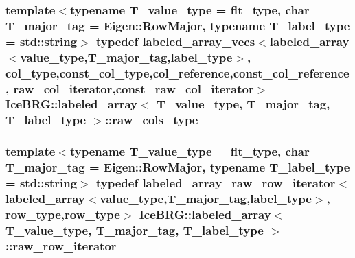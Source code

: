 \subsubsection[{raw\+\_\+cols\+\_\+type}]{\setlength{\rightskip}{0pt plus 5cm}template$<$typename T\+\_\+value\+\_\+type = flt\+\_\+type, char T\+\_\+major\+\_\+tag = Eigen\+::\+Row\+Major, typename T\+\_\+label\+\_\+type = std\+::string$>$ typedef {\bf labeled\+\_\+array\+\_\+vecs}$<${\bf labeled\+\_\+array}$<${\bf value\+\_\+type},T\+\_\+major\+\_\+tag,{\bf label\+\_\+type}$>$, {\bf col\+\_\+type},{\bf const\+\_\+col\+\_\+type},{\bf col\+\_\+reference},{\bf const\+\_\+col\+\_\+reference}, {\bf raw\+\_\+col\+\_\+iterator},{\bf const\+\_\+raw\+\_\+col\+\_\+iterator}$>$ {\bf Ice\+B\+R\+G\+::labeled\+\_\+array}$<$ T\+\_\+value\+\_\+type, T\+\_\+major\+\_\+tag, T\+\_\+label\+\_\+type $>$\+::{\bf raw\+\_\+cols\+\_\+type}}\label{classIceBRG_1_1labeled__array_a5135379d418bba0a185e5c26a9774f78}
\hypertarget{classIceBRG_1_1labeled__array_ade890503843cb998a2d611e2dc56eefb}{}
\subsubsection[{raw\+\_\+row\+\_\+iterator}]{\setlength{\rightskip}{0pt plus 5cm}template$<$typename T\+\_\+value\+\_\+type = flt\+\_\+type, char T\+\_\+major\+\_\+tag = Eigen\+::\+Row\+Major, typename T\+\_\+label\+\_\+type = std\+::string$>$ typedef {\bf labeled\+\_\+array\+\_\+raw\+\_\+row\+\_\+iterator}$<${\bf labeled\+\_\+array}$<${\bf value\+\_\+type},T\+\_\+major\+\_\+tag,{\bf label\+\_\+type}$>$, {\bf row\+\_\+type},{\bf row\+\_\+type}$>$ {\bf Ice\+B\+R\+G\+::labeled\+\_\+array}$<$ T\+\_\+value\+\_\+type, T\+\_\+major\+\_\+tag, T\+\_\+label\+\_\+type $>$\+::{\bf raw\+\_\+row\+\_\+iterator}}\label{classIceBRG_1_1labeled__array_ade890503843cb998a2d611e2dc56eefb}
\hypertarget{classIceBRG_1_1labeled__array_a87c569635102ad3390845861bc9cf5cc}{}
